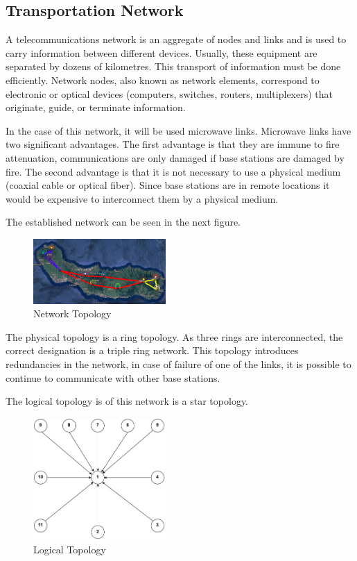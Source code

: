 \documentclass[letterpaper, 10 pt, conference]{ieeeconf}  %
\begin{document}
\subsection{Transportation Network}
\noindent
A telecommunications network is an aggregate of nodes and links and is used to carry information between different devices. Usually, these equipment are separated by dozens of kilometres. This transport of information must be done efficiently. Network nodes, also known as network elements, correspond to electronic or optical devices (computers, switches, routers, multiplexers) that originate, guide, or terminate information.\par\noindent
In the case of this network, it will be used microwave links. Microwave links have two significant advantages. The first advantage is that they are immune to fire attenuation, communications are only damaged if base stations are damaged by fire. The second advantage is that it is not necessary to use a physical medium (coaxial cable or optical fiber). Since base stations are in remote locations it would be expensive to interconnect them by a physical medium.\par\noindent
The established network can be seen in the next figure.
\begin{figure}[h]
    \centering
    \includegraphics[width=0.45\textwidth]{RedeEB.JPG}
    \caption{Network Topology}
    \label{fig:topologia}
\end{figure}
\FloatBarrier

\noindent The physical topology is a ring topology. As three rings are interconnected, the correct designation is a triple ring network. This topology introduces redundancies in the network, in case of failure of one of the links, it is possible to continue to communicate with other base stations.
\par\noindent
The logical topology is of this network is a star topology. 
\begin{figure}
    \centering
    \includegraphics[width=0.45\textwidth]{topologicarede.JPG}
    \caption{Logical Topology}
    \label{fig:logical}
\end{figure}
\end{document}
